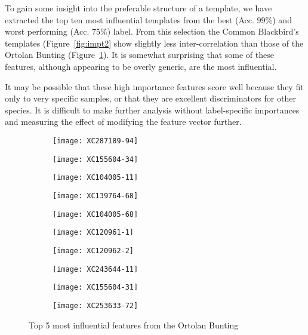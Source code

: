 To gain some insight into the preferable structure of a template, we have
extracted the top ten most influential templates from the best (Acc. 99\%) and
worst performing (Acc. 75\%) label.
From this selection the Common Blackbird's templates (Figure~\ref{fig:impt2}
show slightly less
inter-correlation than those of the Ortolan Bunting (Figure~\ref{fig:impt1}).
It is somewhat surprising that some of these features, although appearing to be
overly generic, are the most influential.

It may be possible that these high importance features score well because they
fit only to very specific samples, or that they are excellent discriminators
for other species.
It is difficult to make further analysis without label-specific importances
and measuring the effect of modifying the feature vector further.

\begin{figure}[!htb]
  \centering
  \begin{subfigure}[b]{0.2\textwidth}
    \centering
    \texttt{[image: XC287189-94]}
  \end{subfigure}%
  \begin{subfigure}[b]{0.2\textwidth}
    \centering
    \texttt{[image: XC155604-34]}
  \end{subfigure}%
  \begin{subfigure}[b]{0.2\textwidth}
    \centering
    \texttt{[image: XC104005-11]}
  \end{subfigure}%
  \begin{subfigure}[b]{0.2\textwidth}
    \centering
    \texttt{[image: XC139764-68]}
  \end{subfigure}%
  \begin{subfigure}[b]{0.2\textwidth}
    \centering
    \texttt{[image: XC104005-68]}
  \end{subfigure}
  \begin{subfigure}[b]{0.2\textwidth}
    \centering
    \texttt{[image: XC120961-1]}
  \end{subfigure}%
  \begin{subfigure}[b]{0.2\textwidth}
    \centering
    \texttt{[image: XC120962-2]}
  \end{subfigure}%
  \begin{subfigure}[b]{0.2\textwidth}
    \centering
    \texttt{[image: XC243644-11]}
  \end{subfigure}%
  \begin{subfigure}[b]{0.2\textwidth}
    \centering
    \texttt{[image: XC155604-31]}
  \end{subfigure}%
  \begin{subfigure}[b]{0.2\textwidth}
    \centering
    \texttt{[image: XC253633-72]}
  \end{subfigure}%
  \caption{Top 5 most influential features from the Ortolan Bunting}
  \label{fig:impt1}
\end{figure}

